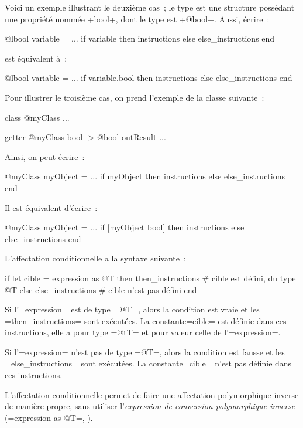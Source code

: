 Voici un exemple illustrant le deuxième cas~; le type  est une structure possèdant une propriété nommée \ggs+bool+, dont le type est \ggs+@bool+. Aussi, écrire~:

\begin{galgas}
@lbool variable = ...
if variable then
  instructions
else
  else_instructions
end
\end{galgas}


est équivalent à~:
\begin{galgas}
@lbool variable = ...
if variable.bool then
  instructions
else
  else_instructions
end
\end{galgas}


Pour illustrer le troisième cas, on prend l'exemple de la classe suivante~:
\begin{galgas}
class @myClass { ... }

getter @myClass bool -> @bool outResult { ... }
\end{galgas}

Ainsi, on peut écrire~:
\begin{galgas}
@myClass myObject = ...
if myObject then
  instructions
else
  else_instructions
end
\end{galgas}


Il est équivalent d'écrire~:
\begin{galgas}
@myClass myObject = ...
if [myObject bool] then
  instructions
else
  else_instructions
end
\end{galgas}



L'affectation conditionnelle a la syntaxe suivante~:
\begin{galgas}
if let cible = expression as @T then
  then_instructions # cible est défini, du type @T
else
  else_instructions # cible n'est pas défini
end
\end{galgas}

Si l'\ggs=expression= est de type \ggs=@T=, alors la condition est vraie et les \ggs=then_instructions= sont exécutées. La constante\ggs=cible= est définie dans ces instructions, elle a pour type \ggs=@tT= et pour valeur celle de l'\ggs=expression=.

Si l'\ggs=expression= n'est pas de type \ggs=@T=, alors la condition est fausse et les \ggs=else_instructions= sont exécutées. La constante\ggs=cible= n'est pas définie dans ces instructions.

L'affectation conditionnelle permet de faire une affectation polymorphique inverse de manière propre, sans utiliser l'\emph{expression de conversion polymorphique inverse} (\ggs=expression as @T=, ).


